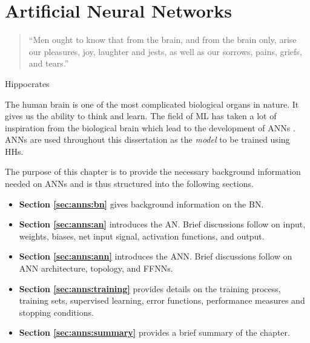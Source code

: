 \chapter{Artificial Neural Networks}
\label{chap:anns}

\begin{quotation}
    \noindent ``Men ought to know that from the brain, and from the brain only, arise our pleasures, joy, laughter and jests, as well as our sorrows, pains, griefs, and tears.''
\end{quotation}
\begin{flushright}
    Hippocrates
\end{flushright}

\noindent
The human brain is one of the most complicated biological organs in nature. It gives us the ability to think and learn. The field of \ac{ML} has taken a lot of inspiration from the biological brain which lead to the development of \acp{ANN} \cite{ref:rosenblatt:1958}. \acp{ANN} are used throughout this dissertation as the \textit{model} to be trained using \acp{HH}.

The purpose of this chapter is to provide the necessary background information needed on \acp{ANN} and is thus structured into the following sections.

\begin{itemize}
    \item \textbf{Section \ref{sec:anns:bn}} gives background information on the \ac{BN}.

    \item \textbf{Section \ref{sec:anns:an}} introduces the \ac{AN}. Brief discussions follow on input, weights, biases, net input signal, activation functions, and output.

    \item \textbf{Section \ref{sec:anns:ann}} introduces the \ac{ANN}. Brief discussions follow on \ac{ANN} architecture, topology, and \acp{FFNN}.

    \item \textbf{Section \ref{sec:anns:training}} provides details on the training process, training sets, supervised learning, error functions, performance measures and stopping conditions.

    \item \textbf{Section \ref{sec:anns:summary}} provides a brief summary of the chapter.
\end{itemize}


